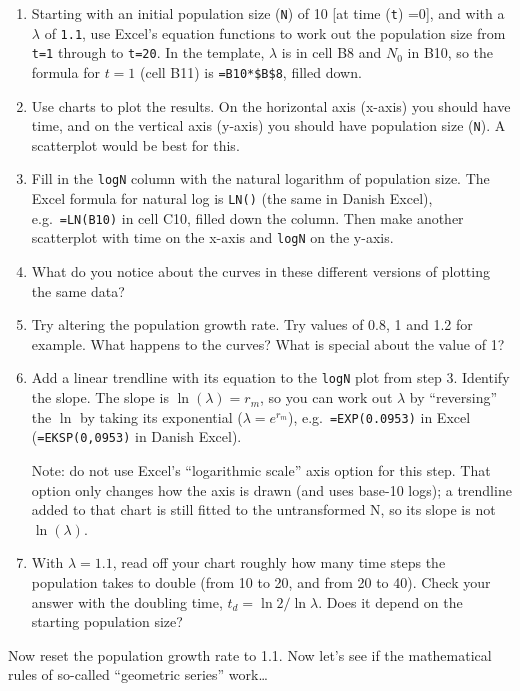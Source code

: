 \documentclass[
  a4paper]{book}
\begin{document}
\begin{enumerate}
\def\labelenumi{\arabic{enumi}.}
\item
  Starting with an initial population size (\texttt{N}) of 10 {[}at time (\texttt{t}) =0{]}, and with a \(\lambda\) of \texttt{1.1}, use Excel's equation functions to work out the population size from \texttt{t=1} through to \texttt{t=20}. In the template, \(\lambda\) is in cell B8 and \(N_0\) in B10, so the formula for \(t = 1\) (cell B11) is \texttt{=B10*\$B\$8}, filled down.
\item
  Use charts to plot the results. On the horizontal axis (x-axis) you should have time, and on the vertical axis (y-axis) you should have population size (\texttt{N}). A scatterplot would be best for this.
\item
  Fill in the \texttt{logN} column with the natural logarithm of population size. The Excel formula for natural log is \texttt{LN()} (the same in Danish Excel), e.g.~\texttt{=LN(B10)} in cell C10, filled down the column. Then make another scatterplot with time on the x-axis and \texttt{logN} on the y-axis.
\item
  What do you notice about the curves in these different versions of plotting the same data?
\item
  Try altering the population growth rate. Try values of 0.8, 1 and 1.2 for example. What happens to the curves? What is special about the value of 1?
\item
  Add a linear trendline with its equation to the \texttt{logN} plot from step 3. Identify the slope. The slope is \(\ln(\lambda) = r_m\), so you can work out \(\lambda\) by ``reversing'' the \(\ln\) by taking its exponential (\(\lambda = e^{r_m}\)), e.g.~\texttt{=EXP(0.0953)} in Excel (\texttt{=EKSP(0,0953)} in Danish Excel).

  Note: do not use Excel's ``logarithmic scale'' axis option for this step. That option only changes how the axis is drawn (and uses base-10 logs); a trendline added to that chart is still fitted to the untransformed N, so its slope is not \(\ln(\lambda)\).
\item
  With \(\lambda = 1.1\), read off your chart roughly how many time steps the population takes to double (from 10 to 20, and from 20 to 40). Check your answer with the doubling time, \(t_d = \ln 2 / \ln \lambda\). Does it depend on the starting population size?
\end{enumerate}

Now reset the population growth rate to 1.1. Now let's see if the mathematical rules of so-called ``geometric series'' work\ldots{}
\end{document}
